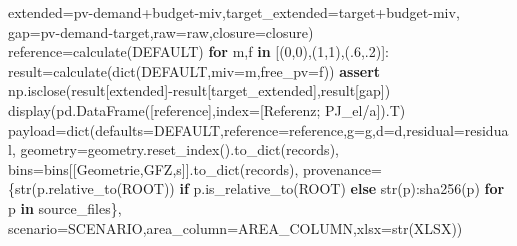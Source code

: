 \documentclass[
  ngerman,
  a4paper,
  DIV=11]{scrreprt}
\newenvironment{Shaded}{\begin{snugshade}}{\end{snugshade}}
\newcommand{\BuiltInTok}[1]{\textcolor[rgb]{0.00,0.23,0.31}{#1}}
\newcommand{\ControlFlowTok}[1]{\textcolor[rgb]{0.00,0.23,0.31}{\textbf{#1}}}
\newcommand{\DecValTok}[1]{\textcolor[rgb]{0.68,0.00,0.00}{#1}}
\newcommand{\FloatTok}[1]{\textcolor[rgb]{0.68,0.00,0.00}{#1}}
\newcommand{\KeywordTok}[1]{\textcolor[rgb]{0.00,0.23,0.31}{\textbf{#1}}}
\newcommand{\NormalTok}[1]{\textcolor[rgb]{0.00,0.23,0.31}{#1}}
\newcommand{\OperatorTok}[1]{\textcolor[rgb]{0.37,0.37,0.37}{#1}}
\newcommand{\StringTok}[1]{\textcolor[rgb]{0.13,0.47,0.30}{#1}}
\begin{document}
\begin{Shaded}
\begin{Highlighting}[]
\NormalTok{                extended}\OperatorTok{=}\NormalTok{pv}\OperatorTok{{-}}\NormalTok{demand}\OperatorTok{+}\NormalTok{budget}\OperatorTok{{-}}\NormalTok{miv,target\_extended}\OperatorTok{=}\NormalTok{target}\OperatorTok{+}\NormalTok{budget}\OperatorTok{{-}}\NormalTok{miv,}
\NormalTok{                gap}\OperatorTok{=}\NormalTok{pv}\OperatorTok{{-}}\NormalTok{demand}\OperatorTok{{-}}\NormalTok{target,raw}\OperatorTok{=}\NormalTok{raw,closure}\OperatorTok{=}\NormalTok{closure)}
\NormalTok{reference}\OperatorTok{=}\NormalTok{calculate(DEFAULT)}
\ControlFlowTok{for}\NormalTok{ m,f }\KeywordTok{in}\NormalTok{ [(}\DecValTok{0}\NormalTok{,}\DecValTok{0}\NormalTok{),(}\DecValTok{1}\NormalTok{,}\DecValTok{1}\NormalTok{),(}\FloatTok{.6}\NormalTok{,}\FloatTok{.2}\NormalTok{)]:}
\NormalTok{    result}\OperatorTok{=}\NormalTok{calculate(}\BuiltInTok{dict}\NormalTok{(DEFAULT,miv}\OperatorTok{=}\NormalTok{m,free\_pv}\OperatorTok{=}\NormalTok{f))}
    \ControlFlowTok{assert}\NormalTok{ np.isclose(result[}\StringTok{\textquotesingle{}extended\textquotesingle{}}\NormalTok{]}\OperatorTok{{-}}\NormalTok{result[}\StringTok{\textquotesingle{}target\_extended\textquotesingle{}}\NormalTok{],result[}\StringTok{\textquotesingle{}gap\textquotesingle{}}\NormalTok{])}
\NormalTok{display(pd.DataFrame([reference],index}\OperatorTok{=}\NormalTok{[}\StringTok{\textquotesingle{}Referenz; PJ\_el/a\textquotesingle{}}\NormalTok{]).T)}
\NormalTok{payload}\OperatorTok{=}\BuiltInTok{dict}\NormalTok{(defaults}\OperatorTok{=}\NormalTok{DEFAULT,reference}\OperatorTok{=}\NormalTok{reference,g}\OperatorTok{=}\NormalTok{g,d}\OperatorTok{=}\NormalTok{d,residual}\OperatorTok{=}\NormalTok{residual,}
\NormalTok{             geometry}\OperatorTok{=}\NormalTok{geometry.reset\_index().to\_dict(}\StringTok{\textquotesingle{}records\textquotesingle{}}\NormalTok{),}
\NormalTok{             bins}\OperatorTok{=}\NormalTok{bins[[}\StringTok{\textquotesingle{}Geometrie\textquotesingle{}}\NormalTok{,}\StringTok{\textquotesingle{}GFZ\textquotesingle{}}\NormalTok{,}\StringTok{\textquotesingle{}s\textquotesingle{}}\NormalTok{]].to\_dict(}\StringTok{\textquotesingle{}records\textquotesingle{}}\NormalTok{),}
\NormalTok{             provenance}\OperatorTok{=}\NormalTok{\{}\BuiltInTok{str}\NormalTok{(p.relative\_to(ROOT)) }\ControlFlowTok{if}\NormalTok{ p.is\_relative\_to(ROOT) }\ControlFlowTok{else} \BuiltInTok{str}\NormalTok{(p):sha256(p) }\ControlFlowTok{for}\NormalTok{ p }\KeywordTok{in}\NormalTok{ source\_files\},}
\NormalTok{             scenario}\OperatorTok{=}\NormalTok{SCENARIO,area\_column}\OperatorTok{=}\NormalTok{AREA\_COLUMN,xlsx}\OperatorTok{=}\BuiltInTok{str}\NormalTok{(XLSX))}
\end{Highlighting}
\end{Shaded}
\end{document}
